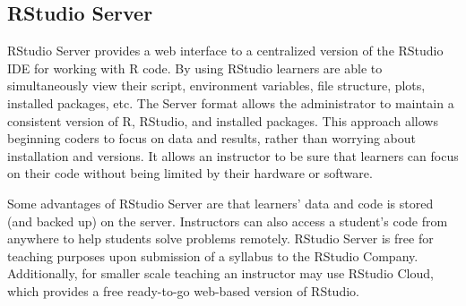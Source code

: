 \subsection{RStudio Server}\label{subsub:RStudio}



RStudio Server provides a web interface to a centralized version of the RStudio IDE for working with R code. By using RStudio learners are able to simultaneously view their script, environment variables, file structure, plots, installed packages, etc. The Server format allows the administrator to maintain a consistent version of R, RStudio, and installed packages. This approach allows beginning coders to focus on data and results, rather than worrying about installation and versions. It allows an instructor to be sure that learners can focus on their code without being limited by their hardware or software.



Some advantages of RStudio Server are that learners' data and code is stored (and backed up) on the server. 
Instructors can also access a student's code from anywhere to help students solve problems remotely.
RStudio Server is free for teaching purposes upon submission of a syllabus to the RStudio Company.
Additionally, for smaller scale teaching an instructor may use RStudio Cloud, which provides a free ready-to-go web-based version of RStudio.

{}

